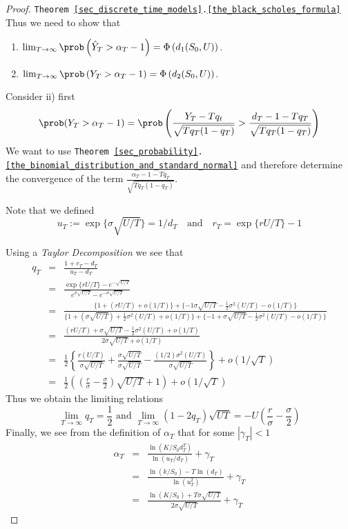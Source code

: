 \documentclass[11pt,a4paper]{article}
\begin{document}
\begin{proof}{\texttt{Theorem  \ref{sec_discrete_time_models}.\ref{the_black_scholes_formula}}}
  Thus we need to show that
  \begin{enumerate}
    \item $\lim_{T\to\infty}\prob\left(\hat{Y}_T>\alpha_T-1\right)=\Phi\left(d_1(S_0,U)\right)$.
    \item $\lim_{T\to\infty}\prob\left(Y_T>\alpha_T-1\right)=\Phi\left(d_2(S_0,U)\right)$.
  \end{enumerate}
  Consider ii) first
  \[ \prob(Y_T>\alpha_T-1)=\prob\left(\frac{Y_T-Tq_t}{\sqrt{Tq_T(1-q_T)}}>\frac{d_T-1-Tq_T}{\sqrt{Tq_T(1-q_T)}}\right) \]
  We want to use \texttt{Theorem \ref{sec_probability}.\ref{the_binomial_distribution_and_standard_normal}} and therefore determine the convergence of the term $\frac{\alpha_T-1-Tq_T}{\sqrt{Tq_T(1-q_T)}}$.
  \par Note that we defined
  \[ u_T:=\exp\{\sigma\sqrt{U/T}\}=1/d_T\quad\text{and}\quad r_T=\exp\{rU/T\}-1 \]
  \par Using a \textit{Taylor Decomposition} we see that
  \[\begin{array}{rcl}
    q_T&=&\frac{1+r_T-d_T}{u_T-d_T}\\
    &=&\frac{\exp\{rU/T\}-e^{-\sqrt{U/T}}}{e^{\sigma\sqrt{U/T}}-e^{-\sigma\sqrt{U/T}}}\\
    &=&\frac{\{1+(rU/T)+o(1/T)\}  +\{-1\sigma\sqrt{U/T}-\frac12\sigma^2(U/T)-o(1/T)\}}{\{1+(\sigma\sqrt{U/T})+\frac12\sigma^2(U/T)+o(1/T)\}+\{-1+\sigma\sqrt{U/T}-\frac12\sigma^2(U/T)-o(1/T)\}}\\
    &=&\frac{(rU/T)+\sigma\sqrt{U/T}-\frac12\sigma^2(U/T)+o(1/T)}{2\sigma\sqrt{U/T}+o(1/T)}\\
    &=&\frac12\left\{\frac{r(U/T)}{\sigma\sqrt{U/T}}+\frac{\sigma\sqrt{U/T}}{\sigma\sqrt{U/T}}-\frac{(1/2)\sigma^2(U/T)}{\sigma\sqrt{U/T}}\right\}+o(1/\sqrt{T})\\
    &=&\frac12\left(\left(\frac{r}\sigma-\frac\sigma2\right)\sqrt{U/T}+1\right)+o(1/\sqrt{T})
  \end{array}\]
  Thus we obtain the limiting relations
  \[ \lim_{T\to\infty}q_T=\frac12\text{ and }\lim_{T\to\infty}(1-2q_T)\sqrt{UT}=-U\left(\frac{r}{\sigma}-\frac\sigma2\right) \]
  Finally, we see from the definition of $\alpha_T$ that for some $|\gamma_T|<1$
  \[\begin{array}{rcl}
    \alpha_T&=&\frac{\ln(K/S_0d_T^T)}{\ln(u_T/d_T)}+\gamma_T\\
    &=&\frac{\ln(k/S_0)-T\ln(d_T)}{\ln(u_T^2)}+\gamma_T\\
    &=&\frac{\ln(K/S_0)+T\sigma\sqrt{U/T}}{2\sigma\sqrt{U/T}}+\gamma_T

\end{array}\]
\end{proof}
\end{document}
